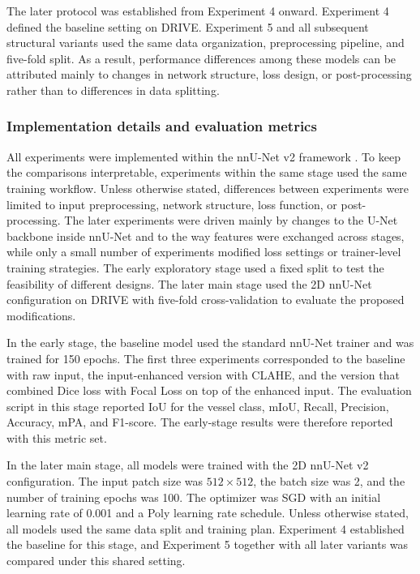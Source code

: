 \documentclass[a4paper,12pt]{article}
\begin{document}
The later protocol was established from Experiment 4 onward. Experiment 4 defined the baseline setting on DRIVE. Experiment 5 and all subsequent structural variants used the same data organization, preprocessing pipeline, and five-fold split. As a result, performance differences among these models can be attributed mainly to changes in network structure, loss design, or post-processing rather than to differences in data splitting.

\subsubsection{Implementation details and evaluation metrics}

All experiments were implemented within the nnU-Net v2 framework \cite{isensee2021nnunet}. To keep the comparisons interpretable, experiments within the same stage used the same training workflow. Unless otherwise stated, differences between experiments were limited to input preprocessing, network structure, loss function, or post-processing. The later experiments were driven mainly by changes to the U-Net backbone inside nnU-Net and to the way features were exchanged across stages, while only a small number of experiments modified loss settings or trainer-level training strategies. The early exploratory stage used a fixed split to test the feasibility of different designs. The later main stage used the 2D nnU-Net configuration on DRIVE with five-fold cross-validation to evaluate the proposed modifications.

In the early stage, the baseline model used the standard nnU-Net trainer and was trained for 150 epochs. The first three experiments corresponded to the baseline with raw input, the input-enhanced version with CLAHE, and the version that combined Dice loss with Focal Loss on top of the enhanced input. The evaluation script in this stage reported IoU for the vessel class, mIoU, Recall, Precision, Accuracy, mPA, and F1-score. The early-stage results were therefore reported with this metric set.

In the later main stage, all models were trained with the 2D nnU-Net v2 configuration. The input patch size was \(512 \times 512\), the batch size was 2, and the number of training epochs was 100. The optimizer was SGD with an initial learning rate of 0.001 and a Poly learning rate schedule. Unless otherwise stated, all models used the same data split and training plan. Experiment 4 established the baseline for this stage, and Experiment 5 together with all later variants was compared under this shared setting.
\end{document}
